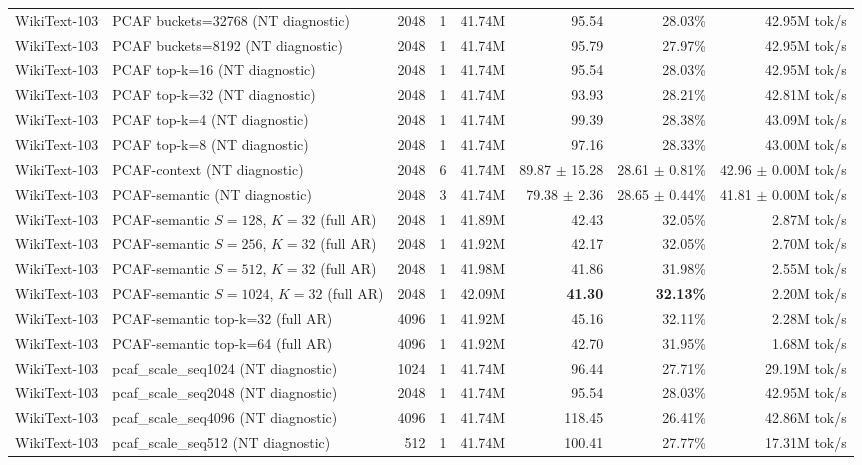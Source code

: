 \documentclass[11pt]{article}
\begin{document}
\begin{table}[H]
{\begin{tabular}{@{}llrrrrrr@{}}
    WikiText-103 & PCAF buckets=32768 (NT diagnostic) & 2048 & 1 & 41.74M & 95.54 & 28.03\% & 42.95M tok/s \\
    WikiText-103 & PCAF buckets=8192 (NT diagnostic) & 2048 & 1 & 41.74M & 95.79 & 27.97\% & 42.95M tok/s \\
    WikiText-103 & PCAF top-k=16 (NT diagnostic) & 2048 & 1 & 41.74M & 95.54 & 28.03\% & 42.95M tok/s \\
    WikiText-103 & PCAF top-k=32 (NT diagnostic) & 2048 & 1 & 41.74M & 93.93 & 28.21\% & 42.81M tok/s \\
    WikiText-103 & PCAF top-k=4 (NT diagnostic) & 2048 & 1 & 41.74M & 99.39 & 28.38\% & 43.09M tok/s \\
    WikiText-103 & PCAF top-k=8 (NT diagnostic) & 2048 & 1 & 41.74M & 97.16 & 28.33\% & 43.00M tok/s \\
    WikiText-103 & PCAF-context (NT diagnostic) & 2048 & 6 & 41.74M & 89.87 $\pm$ 15.28 & 28.61 $\pm$ 0.81\% & 42.96 $\pm$ 0.00M tok/s \\
    WikiText-103 & PCAF-semantic (NT diagnostic) & 2048 & 3 & 41.74M & 79.38 $\pm$ 2.36 & 28.65 $\pm$ 0.44\% & 41.81 $\pm$ 0.00M tok/s \\
    \midrule
    WikiText-103 & PCAF-semantic $S=128$, $K=32$ (full AR) & 2048 & 1 & 41.89M & 42.43 & 32.05\% & 2.87M tok/s \\
    WikiText-103 & PCAF-semantic $S=256$, $K=32$ (full AR) & 2048 & 1 & 41.92M & 42.17 & 32.05\% & 2.70M tok/s \\
    WikiText-103 & PCAF-semantic $S=512$, $K=32$ (full AR) & 2048 & 1 & 41.98M & 41.86 & 31.98\% & 2.55M tok/s \\
    WikiText-103 & PCAF-semantic $S=1024$, $K=32$ (full AR) & 2048 & 1 & 42.09M & \textbf{41.30} & \textbf{32.13\%} & 2.20M tok/s \\
    \midrule
    WikiText-103 & PCAF-semantic top-k=32 (full AR) & 4096 & 1 & 41.92M & 45.16 & 32.11\% & 2.28M tok/s \\
    WikiText-103 & PCAF-semantic top-k=64 (full AR) & 4096 & 1 & 41.92M & 42.70 & 31.95\% & 1.68M tok/s \\
    WikiText-103 & pcaf\_scale\_seq1024 (NT diagnostic) & 1024 & 1 & 41.74M & 96.44 & 27.71\% & 29.19M tok/s \\
    WikiText-103 & pcaf\_scale\_seq2048 (NT diagnostic) & 2048 & 1 & 41.74M & 95.54 & 28.03\% & 42.95M tok/s \\
    WikiText-103 & pcaf\_scale\_seq4096 (NT diagnostic) & 4096 & 1 & 41.74M & 118.45 & 26.41\% & 42.86M tok/s \\
    WikiText-103 & pcaf\_scale\_seq512 (NT diagnostic) & 512 & 1 & 41.74M & 100.41 & 27.77\% & 17.31M tok/s \\
    \bottomrule
  \end{tabular}
  }
  \endgroup
\end{table}
\FloatBarrier
\end{document}

